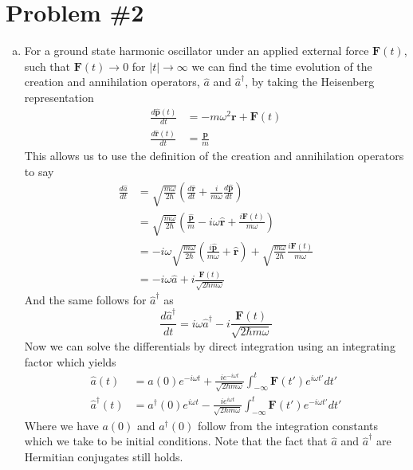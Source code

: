 \documentclass[11pt]{article}
\numberwithin{equation}{section}
\begin{document}
\pagebreak

\section{Problem \#2}
\begin{enumerate}[(a)]
\item For a ground state harmonic oscillator under an applied external force $\mathbf{F}(t)$, 
such that $\mathbf{F}(t)\rightarrow{0}$ for $|t|\rightarrow\infty$ we can find the time 
evolution of the creation and annihilation operators, $\hat{a}$ and $\hat{a}^{\dagger}$, by taking the
Heisenberg representation 
\begin{align*}
\frac{d\hat{\mathbf{p}}(t)}{dt} &= -m\omega^2\mathbf{r} + \mathbf{F}(t)\\
\frac{d\hat{\mathbf{r}}(t)}{dt} &= \frac{\mathbf{p}}{m}
\end{align*}
This allows us to use the definition of the creation and annihilation operators to say
\begin{align*}
\frac{d\hat{a}}{dt} &= \sqrt{\frac{m\omega}{2\hbar}}\left(\frac{d\hat{\mathbf{r}}}{dt}+\frac{i}{m\omega}\frac{d\hat{\mathbf{p}}}{dt}\right)\\
&= \sqrt{\frac{m\omega}{2\hbar}}\left(\frac{\hat{\mathbf{p}}}{m} - i\omega\hat{\mathbf{r}} + \frac{i\mathbf{F}(t)}{m\omega}\right)\\
&= -i\omega\sqrt{\frac{m\omega}{2\hbar}}\left(\frac{i\hat{\mathbf{p}}}{m\omega} + \hat{\mathbf{r}}\right) + \sqrt{\frac{m\omega}{2\hbar}}\frac{i\mathbf{F}(t)}{m\omega}\\
&= -i\omega\hat{a} + i\frac{\mathbf{F}(t)}{\sqrt{2\hbar{m}\omega}}
\end{align*}
And the same follows for $\hat{a}^{\dagger}$ as
$$\frac{d\hat{a}^{\dagger}}{dt} = i\omega\hat{a}^{\dagger} - i\frac{\mathbf{F}(t)}{\sqrt{2\hbar{m}\omega}}$$
Now we can solve the differentials by direct integration using an integrating factor which 
yields
\begin{align*}
\hat{a}(t) &= a(0)e^{-i\omega{t}} + \frac{ie^{-i\omega{t}}}{\sqrt{2\hbar{m}\omega}}\int_{-\infty}^{t}\mathbf{F}(t')e^{i\omega{t'}}dt'\\
\hat{a}^{\dagger}(t) &= a^{\dagger}(0)e^{i\omega{t}} - \frac{ie^{i\omega{t}}}{\sqrt{2\hbar{m}\omega}}\int_{-\infty}^{t}\mathbf{F}(t')e^{-i\omega{t'}}dt'
\end{align*}
Where we have $a(0)$ and $a^{\dagger}(0)$ follow from the integration constants which we take
to be initial conditions. Note that the fact that $\hat{a}$ and $\hat{a}^{\dagger}$ are 
Hermitian conjugates still holds. 


\end{enumerate}
\end{document}
